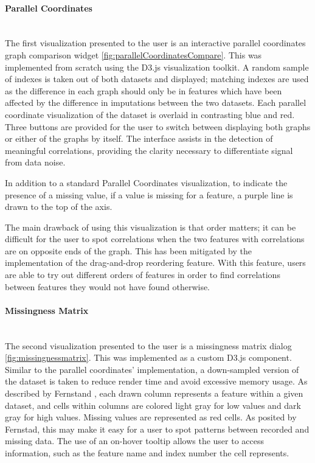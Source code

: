 \documentclass[a4paper, 11pt]{article}
\begin{document}
\paragraph{\textbf{Parallel Coordinates}} ~\\ 
The first visualization presented to the user is an interactive parallel
coordinates graph comparison widget \cref{fig:parallelCoordinatesCompare}. This
was implemented from scratch using the D3.js visualization toolkit. A random
sample of indexes is taken out of both datasets and displayed; matching indexes
are used as the difference in each graph should only be in features which have
been affected by the difference in imputations between the two datasets. Each
parallel coordinate visualization of the dataset is overlaid in contrasting
blue and red. Three buttons are provided for the user to switch between
displaying both graphs or either of the graphs by itself. The interface assists
in the detection of meaningful correlations, providing the clarity necessary to
differentiate signal from data noise.

In addition to a standard Parallel Coordinates visualization, to indicate the
presence of a missing value, if a value is missing for a feature, a purple line
is drawn to the top of the axis.

The main drawback of using this visualization is that order matters; it can be
difficult for the user to spot correlations when the two features with
correlations are on opposite ends of the graph. This has been mitigated by the
implementation of the drag-and-drop reordering feature. With this feature,
users are able to try out different orders of features in order to find
correlations between features they would not have found otherwise.

\paragraph{\textbf{Missingness Matrix}} ~\\  
\label{missingmessmatrix_explan}
The second visualization presented to the user is a missingness matrix dialog
\cref{fig:missingnessmatrix}. This was implemented as a custom D3.js component.
Similar to the parallel coordinates' implementation, a down-sampled version of
the dataset is taken to reduce render time and avoid excessive memory usage. As
described by Fernstand \cite{fernstad_identify_2019}, each drawn column
represents a feature within a given dataset, and cells within columns are colored
light gray for low values and dark gray for high values. Missing values are
represented as red cells. As posited by Fernstad, this may make it easy for a
user to spot patterns between recorded and missing data. The use of an on-hover
tooltip allows the user to access information, such as the feature name and index
number the cell represents.
\end{document}
